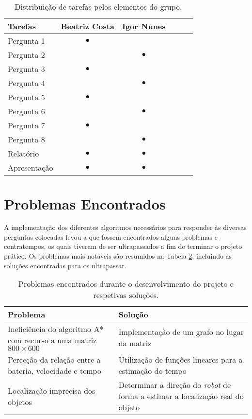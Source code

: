\begin{table}[!htbp]
	\centering
	\begin{tabular}{l c c c c c}
		\toprule
		\textbf{Tarefas} & \textbf{Beatriz Costa} & \textbf{Igor Nunes}\\
		\midrule
		Pergunta 1      &   $\bullet$   &               \\
        Pergunta 2      &               &   $\bullet$   \\
        Pergunta 3      &   $\bullet$   &               \\
        Pergunta 4      &               &   $\bullet$   \\
        Pergunta 5      &   $\bullet$   &               \\
        Pergunta 6      &               &   $\bullet$   \\
        Pergunta 7      &   $\bullet$   &               \\
        Pergunta 8      &               &   $\bullet$   \\
        Relatório       &   $\bullet$   &   $\bullet$   \\
        Apresentação    &   $\bullet$   &   $\bullet$   \\
		\bottomrule
	\end{tabular}
	\caption[Distribuição de tarefas]{Distribuição de tarefas pelos elementos do grupo.}
	\label{tab::divisao-trabalho}
\end{table}


\section{Problemas Encontrados}
\label{sec::reflexao:problemas}

A implementação dos diferentes algoritmos necessários para responder às diversas perguntas colocadas levou a que fossem encontrados alguns problemas e contratempos, os quais tiveram de ser ultrapassados a fim de terminar o projeto prático. Os problemas mais notáveis são resumidos na Tabela \ref{tab::problemas}, incluindo as soluções encontradas para os ultrapassar.

\begin{table}[!htbp]
	\centering
	\begin{tabular}{p{} p{}}
		\toprule
		{\bfseries Problema} & {\bfseries Solução} \\
		\midrule
		\midrule
		Ineficiência do algoritmo A* com recurso a uma matriz $800 \times 600$ & Implementação de um grafo no lugar da matriz\\
		\midrule
		Perceção da relação entre a bateria, velocidade e tempo & Utilização de funções lineares para a estimação do tempo\\
		\midrule
		Localização imprecisa dos objetos & Determinar a direção do \emph{robot} de forma a estimar a localização real do objeto \\
		\bottomrule
	\end{tabular}
	\caption[Problemas encontrados e respetivas soluções]{Problemas encontrados durante o desenvolvimento do projeto e respetivas soluções.}
	\label{tab::problemas}
\end{table}


